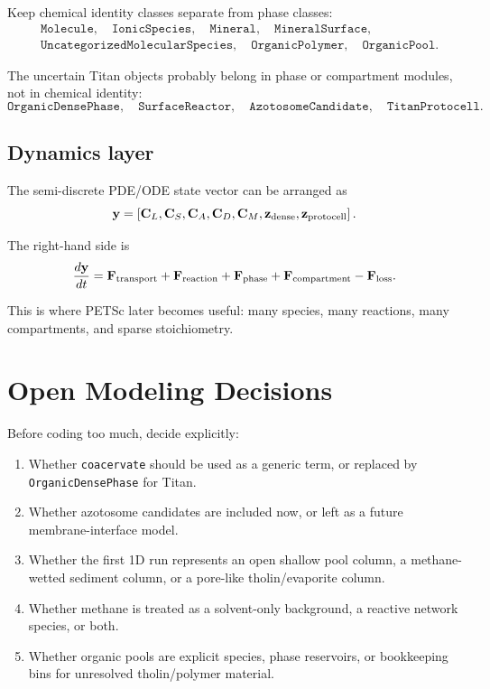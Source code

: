 \documentclass[11pt]{article}
\begin{document}
Keep chemical identity classes separate from phase classes:
\begin{align}
&\texttt{Molecule},\quad
\texttt{IonicSpecies},\quad
\texttt{Mineral},\quad
\texttt{MineralSurface},\nonumber\\
&\texttt{UncategorizedMolecularSpecies},\quad
\texttt{OrganicPolymer},\quad
\texttt{OrganicPool}.
\end{align}

The uncertain Titan objects probably belong in phase or compartment modules, not in chemical identity:
\begin{equation}
\texttt{OrganicDensePhase},\quad
\texttt{SurfaceReactor},\quad
\texttt{AzotosomeCandidate},\quad
\texttt{TitanProtocell}.
\end{equation}

\subsection{Dynamics layer}

The semi-discrete PDE/ODE state vector can be arranged as
\begin{equation}
\mathbf{y}
=
\left[
\mathbf{C}_L,\mathbf{C}_S,\mathbf{C}_A,\mathbf{C}_D,\mathbf{C}_M,
\mathbf{z}_{\rm dense},
\mathbf{z}_{\rm protocell}
\right].
\end{equation}

The right-hand side is
\begin{equation}
\frac{d\mathbf{y}}{dt}
=
\mathbf{F}_{\rm transport}
+
\mathbf{F}_{\rm reaction}
+\mathbf{F}_{\rm phase}
+\mathbf{F}_{\rm compartment}
-\mathbf{F}_{\rm loss}.
\end{equation}

This is where PETSc later becomes useful: many species, many reactions, many compartments, and sparse stoichiometry.

\section{Open Modeling Decisions}

Before coding too much, decide explicitly:
\begin{enumerate}
\item Whether \texttt{coacervate} should be used as a generic term, or replaced by \texttt{OrganicDensePhase} for Titan.
\item Whether azotosome candidates are included now, or left as a future membrane-interface model.
\item Whether the first 1D run represents an open shallow pool column, a methane-wetted sediment column, or a pore-like tholin/evaporite column.
\item Whether methane is treated as a solvent-only background, a reactive network species, or both.
\item Whether organic pools are explicit species, phase reservoirs, or bookkeeping bins for unresolved tholin/polymer material.
\end{enumerate}
\end{document}
